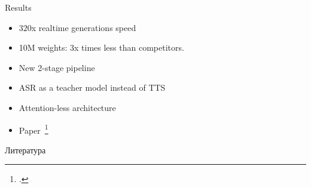 \begin{frame}{Results}
\begin{itemize}
    \item $320$x realtime generations speed
    \item 10M weights: 3x times less than competitors.
    \item New 2-stage pipeline
    \item ASR as a teacher model instead of TTS
    \item Attention-less architecture
    \item Paper~\footcite{beliaev2020talknet}
\end{itemize}
\end{frame}

\begin{frame}{Литература}
\printbibliography[heading=none]
\end{frame}


